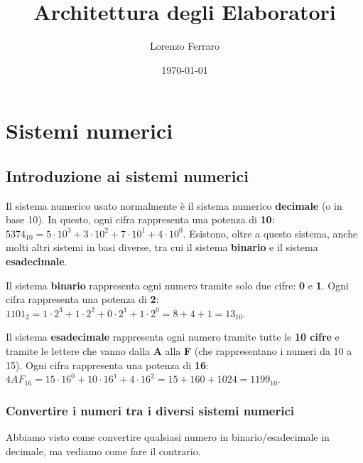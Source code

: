\documentclass[11pt, a4paper, titlepage, oneside]{scrbook}
\title{Architettura degli Elaboratori}
\author{Lorenzo Ferraro}
\date{\today}
\begin{document}
\frontmatter
\SapienzaCoverItalianoTriennale
\InfoSegnalazioni

\tableofcontents

\mainmatter

\chapter{Sistemi numerici}

\section{Introduzione ai sistemi numerici}

Il sistema numerico usato normalmente è il sistema numerico \textbf{decimale} (o in base 10). In questo, ogni cifra rappresenta una potenza di \textbf{10}: $5374_{10} = 5 \cdot 10^3 + 3 \cdot 10^2 + 7 \cdot 10^1 + 4 \cdot 10^0$. Esistono, oltre a questo sistema, anche molti altri sistemi in basi diverse, tra cui il sistema \textbf{binario} e il sistema \textbf{esadecimale}.

\begin{Definizione}
\label{def-sistema-binario}
Il sistema \textbf{binario} rappresenta ogni numero tramite solo due cifre: \textbf{0} e \textbf{1}. Ogni cifra rappresenta una potenza di \textbf{2}: $1101_2 = 1 \cdot 2^3 + 1 \cdot 2^2 + 0 \cdot 2^1 + 1 \cdot 2^0 = 8 + 4 + 1 = 13_{10}$. 
\end{Definizione}

\begin{Definizione}
\label{def-sistema-esadecimale}
Il sistema \textbf{esadecimale} rappresenta ogni numero tramite tutte le \textbf{10 cifre} e tramite le lettere che vanno dalla \textbf{A} alla \textbf{F} (che rappresentano i numeri da 10 a 15). Ogni cifra rappresenta una potenza di \textbf{16}: $4AF_{16} = 15 \cdot 16^0 + 10 \cdot 16^1 + 4 \cdot 16^2 =  15 + 160 + 1024 = 1199_{10}$.
\end{Definizione}

\subsection{Convertire i numeri tra i diversi sistemi numerici}

Abbiamo visto come convertire qualsiasi numero in binario/esadecimale in decimale, ma vediamo come fare il contrario.
\end{document}
